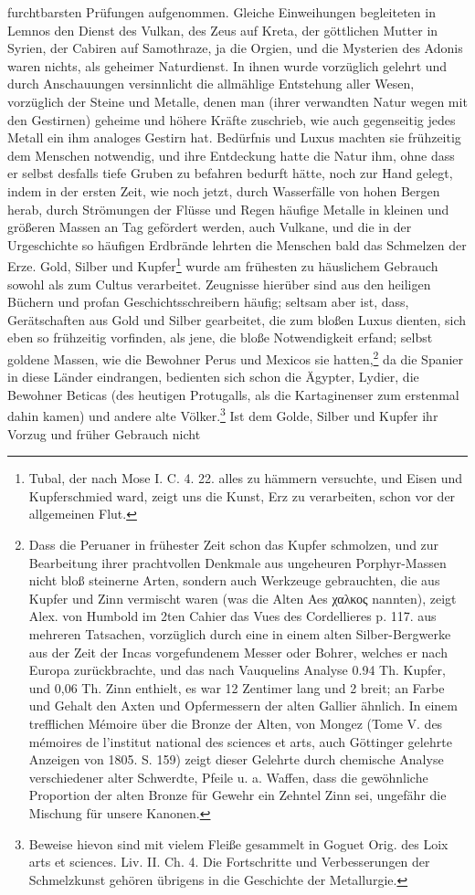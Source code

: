 \documentclass[a4paper, 11pt, oneside, polutonikogreek, german]{article}
\begin{document}
furchtbarsten Prüfungen aufgenommen. Gleiche Einweihungen begleiteten in Lemnos den Dienst des Vulkan, des Zeus auf Kreta, der göttlichen Mutter in Syrien, der Cabiren auf Samothraze, ja die Orgien, und die Mysterien des Adonis waren nichts, als geheimer Naturdienst. In ihnen wurde vorzüglich gelehrt und durch Anschauungen versinnlicht die allmählige Entstehung aller Wesen, vorzüglich der Steine und Metalle, denen man (ihrer verwandten Natur wegen mit den Gestirnen) geheime und höhere Kräfte zuschrieb, wie auch gegenseitig jedes Metall ein ihm analoges Gestirn hat. Bedürfnis und Luxus machten sie frühzeitig dem Menschen notwendig, und ihre Entdeckung hatte die Natur ihm, ohne dass er selbst desfalls tiefe Gruben zu befahren bedurft hätte, noch zur Hand gelegt, indem in der ersten Zeit, wie noch jetzt, durch Wasserfälle von hohen Bergen herab, durch Strömungen der Flüsse und Regen häufige Metalle in kleinen und größeren Massen an Tag gefördert werden, auch Vulkane, und die in der Urgeschichte so häufigen Erdbrände lehrten die Menschen bald das Schmelzen der Erze. Gold, Silber und Kupfer\footnote{Tubal, der nach Mose I. C. 4. 22. alles zu hämmern versuchte, und Eisen und Kupferschmied ward, zeigt uns die Kunst, Erz zu verarbeiten, schon vor der allgemeinen Flut.} wurde am frühesten zu häuslichem Gebrauch sowohl als zum Cultus verarbeitet. Zeugnisse hierüber sind aus den heiligen Büchern und profan Geschichtsschreibern häufig; seltsam aber ist, dass, Gerätschaften aus Gold und Silber gearbeitet, die zum bloßen Luxus dienten, sich eben so frühzeitig vorfinden, als jene, die bloße Notwendigkeit erfand; selbst goldene Massen, wie die Bewohner Perus und Mexicos sie hatten,\footnote{Dass die Peruaner in frühester Zeit schon das Kupfer schmolzen, und zur Bearbeitung ihrer prachtvollen Denkmale aus ungeheuren Porphyr-Massen nicht bloß steinerne Arten, sondern auch Werkzeuge gebrauchten, die aus Kupfer und Zinn vermischt waren (was die Alten Aes χαλκος nannten), zeigt Alex. von Humbold im 2ten Cahier das Vues des Cordellieres p. 117. aus mehreren Tatsachen, vorzüglich durch eine in einem alten Silber-Bergwerke aus der Zeit der Incas vorgefundenem Messer oder Bohrer, welches er nach Europa zurückbrachte, und das nach Vauquelins Analyse 0.94 Th. Kupfer, und 0,06 Th. Zinn enthielt, es war 12 Zentimer lang und 2 breit; an Farbe und Gehalt den Axten und Opfermessern der alten Gallier ähnlich. In einem trefflichen Mémoire über die Bronze der Alten, von Mongez (Tome V. des mémoires de l'institut national des sciences et arts, auch Göttinger gelehrte Anzeigen von 1805. S. 159) zeigt dieser Gelehrte durch chemische Analyse verschiedener alter Schwerdte, Pfeile u. a. Waffen, dass die gewöhnliche Proportion der alten Bronze für Gewehr ein Zehntel Zinn sei, ungefähr die Mischung für unsere Kanonen.} da die Spanier in diese Länder eindrangen, bedienten sich schon die Ägypter, Lydier, die Bewohner Beticas (des heutigen Protugalls, als die Kartaginenser zum erstenmal dahin kamen) und andere alte Völker.\footnote{Beweise hievon sind mit vielem Fleiße gesammelt in Goguet Orig. des Loix arts et sciences. Liv. II. Ch. 4. Die Fortschritte und Verbesserungen der Schmelzkunst gehören übrigens in die Geschichte der Metallurgie.} Ist dem Golde, Silber und Kupfer ihr Vorzug und früher Gebrauch nicht 
\end{document}
